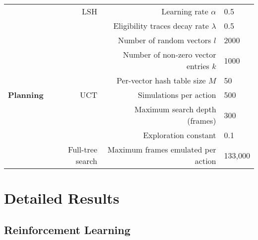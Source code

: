 \documentclass[twoside,11pt]{article}
\begin{document}
\begin{table}[h!]
\begin{center}
\begin{tabular}{|r||r||r|l|}
& LSH & Learning rate $\alpha$ & 0.5 \\
\cline{3-4}
& & Eligibility traces decay rate $\lambda$ & 0.5 \\
\cline{3-4}
& & Number of random vectors $l$ & 2000 \\
\cline{3-4}
& & Number of non-zero vector entries $k$ & 1000 \\
\cline{3-4}
& & Per-vector hash table size $M$ & 50 \\ 
\hline
\hline
\textbf{Planning} & UCT & Simulations per action & 500 \\
\cline{3-4}
& & Maximum search depth (frames) & 300 \\
\cline{3-4}
& & Exploration constant & 0.1 \\
\cline{2-4}
& Full-tree search & Maximum frames emulated per action & 133,000 \\
\hline
\end{tabular}
\end{center}
\end{table}

\newpage
\section{Detailed Results}\label{appendix:detailed_results}

\subsection{Reinforcement Learning}
\end{document}
